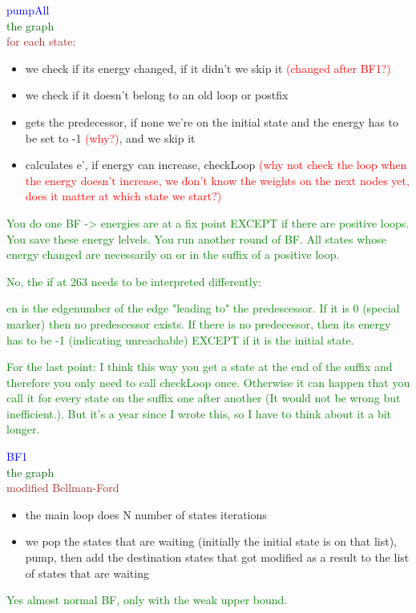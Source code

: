 \documentclass{rapport}
\newcommand{\pscrep}[1]{\textcolor{green}{#1}}
\begin{document}
\vspace{12pt}

\textcolor{blue}{pumpAll}\\
\textcolor[HTML]{006400}{the graph}\\
\textcolor{brown}{for each state:}
\begin{itemize}
    \item we check if its energy changed, if it didn’t we skip it \textcolor{red}{(changed after BF1?)}
    \item we check if it doesn’t belong to an old loop or postfix
    \item gets the predecessor, if none we’re on the initial state and the energy has to be set to -1 \textcolor{red}{(why?)}, and we skip it
    \item calculates e’, if energy can increase, checkLoop \textcolor{red}{(why not check the loop when the energy doesn’t increase, we don’t know the weights on the next nodes yet, does it matter at which state we start?)}
\end{itemize}

\pscrep{You do one BF -> energies are at a fix point EXCEPT if there are positive loops.
You save these energy lelvels. You run another round of BF. All states whose energy changed
are necessarily on or in the suffix of a positive loop.}
\pscrep{No, the if at 263 needs to be interpreted differently:

en is the edgenumber of the edge "leading to" the predescessor. If it is 0
(special marker) then no predescessor exists. If there is no predecessor, then its energy has 
to be -1 (indicating unreachable) EXCEPT if it is the initial state.}
\pscrep{For the last point: I think this way you get a state at the end of the suffix
and therefore you only need to call checkLoop once. Otherwise it can happen
that you call it for every state on the suffix one after another (It would not be
wrong but inefficient.). But it's a year since I wrote this, so I have to think about it a 
bit longer.}

\vspace{12pt}

\textcolor{blue}{BF1}\\
\textcolor[HTML]{006400}{the graph}\\
\textcolor{brown}{modified Bellman-Ford}
\begin{itemize}
    \item the main loop does N number of states iterations
    \item we pop the states that are waiting (initially the initial state is on that list), pump, then add the destination states that got modified as a result to the list of states that are waiting
\end{itemize}
\pscrep{Yes almost normal BF, only with the weak upper bound.}
\vspace{12pt}
\end{document}
